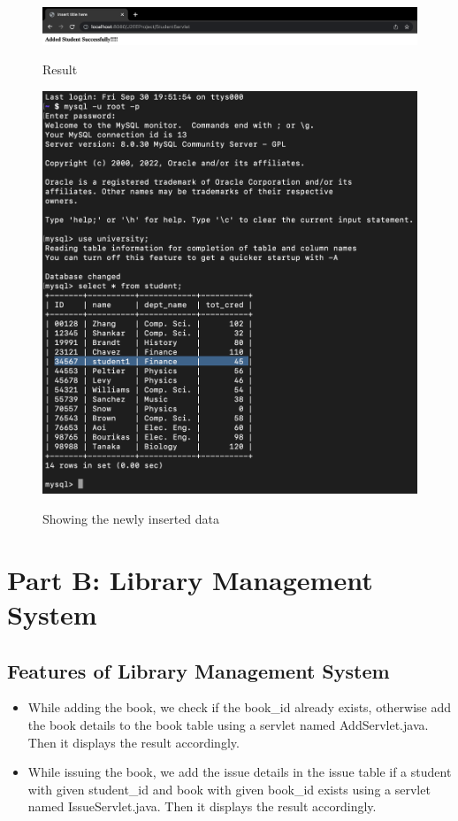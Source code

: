 \documentclass[12pt]{article}
\begin{document}
\newpage

\begin{figure}[!hbt]
    \centering
    \includegraphics[scale=0.4]{screenshots/a13.png}
    \label{fig:my_label1}
    \caption{Result}
\end{figure}

\begin{figure}[!hbt]
    \centering
    \includegraphics[scale=0.6]{screenshots/a14.png}
    \label{fig:my_label1}
    \caption{Showing the newly inserted data}
\end{figure}
\newpage


\section{Part B: Library Management System}

\subsection{Features of Library Management System }
\begin{itemize}
\item While adding the book, we check if the book\_id already exists, otherwise   
    add the book details to the book table using a servlet named
    AddServlet.java. Then it displays the result accordingly.
\item  While issuing the book, we add the issue details in the issue table if a       student with given student\_id and book with given book\_id exists using a        servlet named IssueServlet.java. Then it displays the result accordingly.
\end{itemize}
\end{document}
